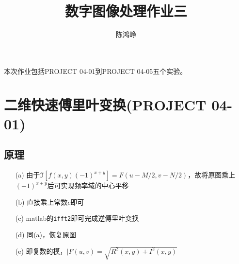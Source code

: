 \documentclass[logo,reportComp]{thesis}
\title{数字图像处理作业三}
\subtitle{}
\author{陈鸿峥}
\begin{document}
\maketitle
本次作业包括PROJECT 04-01到PROJECT 04-05五个实验。

\section{二维快速傅里叶变换(PROJECT 04-01)}
\subsection{原理}
\begin{itemize}
    \item [(a)] 由于$\Im[f(x,y)(-1)^{x+y}]=F(u-M/2,v-N/2)$，故将原图乘上$(-1)^{x+y}$后可实现频率域的中心平移
    \item [(b)] 直接乘上常数$c$即可
    \item [(c)] matlab的\verb'ifft2'即可完成逆傅里叶变换
    \item [(d)] 同(a)，恢复原图
    \item [(e)] 即复数的模，$|F(u,v)=\sqrt{R^2(x,y)+I^2(x,y)}$
\end{itemize}
\end{document}
